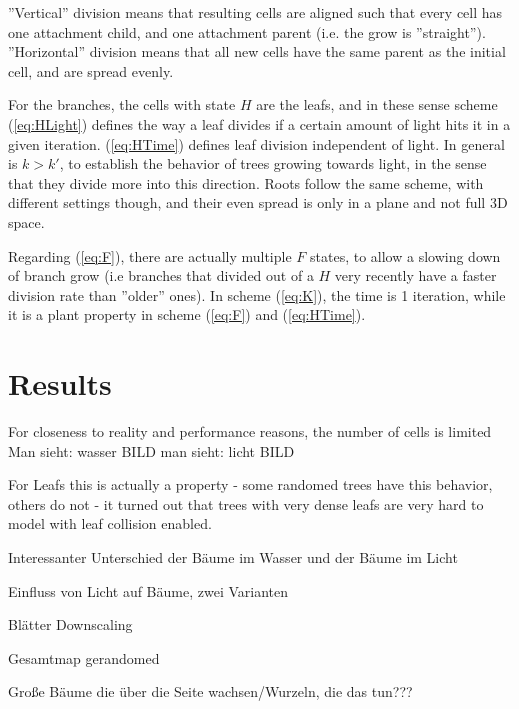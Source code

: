 \documentclass[11pt]{scrartcl}
\begin{document}
''Vertical'' division means that resulting cells are aligned such that every cell has one attachment child, and one attachment parent (i.e. the grow is ''straight''). ''Horizontal'' division means that all new cells have the same parent as the initial cell, and are spread evenly.

For the branches, the cells with state $H$ are the leafs, and in these sense scheme (\ref{eq:HLight}) defines the way a leaf divides if a certain amount of light hits it in a given iteration. (\ref{eq:HTime}) defines leaf division independent of light. In general is $k > k'$, to establish the behavior of trees growing towards light, in the sense that they divide more into this direction. Roots follow the same scheme, with different settings though, and their even spread is only in a plane and not full 3D space.

Regarding (\ref{eq:F}), there are actually multiple $F$ states, to allow a slowing down of branch grow (i.e branches that divided out of a $H$ very recently have a faster division rate than ''older'' ones). In scheme (\ref{eq:K}), the time is 1 iteration, while it is a plant property in scheme (\ref{eq:F}) and (\ref{eq:HTime}).

\section{Results}



For closeness to reality and performance reasons, the number of cells is limited
Man sieht: wasser BILD
man sieht: licht BILD

For Leafs this is actually a property - some randomed trees have this behavior, others do not - it turned out that trees with very dense leafs are very hard to model with leaf collision enabled.

Interessanter Unterschied der Bäume im Wasser und der Bäume im Licht

Einfluss von Licht auf Bäume, zwei Varianten

Blätter Downscaling

Gesamtmap gerandomed

Große Bäume die über die Seite wachsen/Wurzeln, die das tun???
\end{document}
